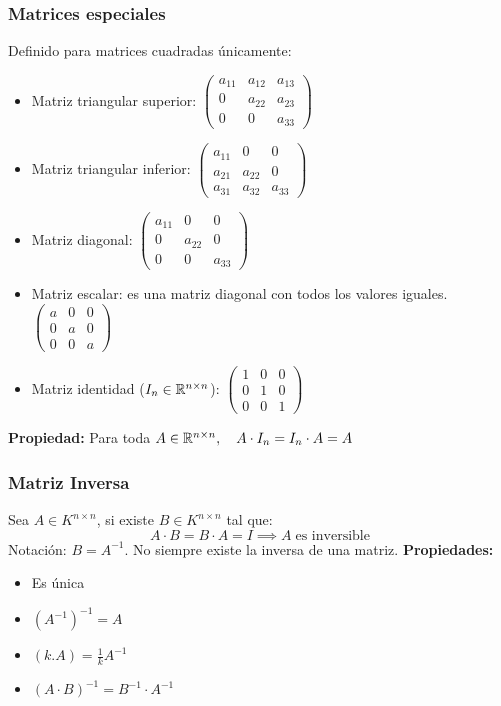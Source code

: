 \subsubsection*{Matrices especiales}
Definido para matrices cuadradas únicamente:
\begin{itemize}
    \item Matriz triangular superior: \(\begin{pmatrix}
        a_{11} & a_{12} & a_{13}\\
        0 & a_{22} & a_{23} \\
        0 & 0 & a_{33}
    \end{pmatrix}\)
    \item Matriz triangular inferior: \(\begin{pmatrix}
        a_{11} & 0 & 0 \\
        a_{21} & a_{22} & 0 \\
        a_{31} & a_{32} & a_{33}
    \end{pmatrix}\)
    \item Matriz diagonal: \(\begin{pmatrix}
        a_{11} & 0 & 0 \\
        0 & a_{22} & 0 \\
        0 & 0 & a_{33}
    \end{pmatrix}\)
    \item Matriz escalar: es una matriz diagonal con todos los valores iguales.
\(\begin{pmatrix}
        a & 0 & 0 \\
        0 & a & 0 \\
        0 & 0 & a
    \end{pmatrix}\)
    \item Matriz identidad (\(I_n \in \mathbb{R}^{n \times n}\)):
    \(\begin{pmatrix}
        1 & 0 & 0 \\
        0 & 1 & 0 \\
        0 & 0 & 1
    \end{pmatrix}\)
\end{itemize}
\textbf{Propiedad:} Para toda \(A \in \mathbb{R}^{n \times n}, \quad A \cdot I_n = I_n \cdot A = A\)
\subsubsection*{Matriz Inversa}
Sea \(A \in K^{n \times n}\), si existe \(B \in K^{n \times n}\) tal que:
\[A \cdot B = B \cdot A = I \implies A \; \text{es inversible}\]
Notación: \(B = A^{-1}\). No siempre existe la inversa de una matriz.
\textbf{Propiedades:}
\begin{itemize}
    \item Es única
    \item \((A^{-1})^{-1} = A\)
    \item \((k.A) = \frac{1}{k} A^{-1}\)
    \item \((A \cdot B)^{-1} = B^{-1} \cdot A^{-1}\)
\end{itemize}
 
